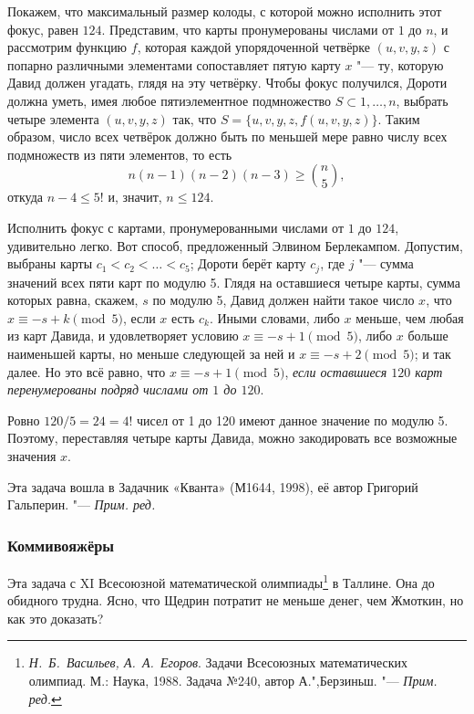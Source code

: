\documentclass[twoside]{book}
\newcommand\VsMO{\emph{Н.~Б.~Васильев, А.~А.~Егоров}. Задачи Всесоюзных математических олимпиад. М.: Наука, 1988}
\newenvironment{addedbytheeditors}{\par\medskip\small
}{\par\addvspace{\medskipamount}} %
\begin{document}
Покажем, что максимальный размер колоды, с которой можно исполнить этот фокус, равен $124$. Представим, что карты
пронумерованы числами от $1$ до $n$, и
рассмотрим функцию $f$, которая каждой упорядоченной четвёрке
$(u,v,y,z)$ с попарно различными элементами сопоставляет пятую карту
$x$ "--- ту, которую Давид должен угадать, глядя на эту четвёрку.
Чтобы фокус получился, Дороти должна уметь, имея любое
пятиэлементное подмножество $S\subset {1, \dots, n}$, выбрать четыре элемента $(u,v,y,z)$ так, что
$S = \{u,v,y,z, f(u,v,y,z)\}$.
Таким образом, число всех четвёрок
должно быть по меньшей мере равно числу всех
подмножеств из пяти элементов, то есть
\[n(n - 1)(n - 2)(n - 3)\ge \binom n5,\]
откуда $n - 4 \le5!$ и, значит, $n\le 124$.


Исполнить фокус с картами, пронумерованными числами от $1$
до $124$, удивительно легко.
Вот способ, предложенный Элвином
Берлекампом.
Допустим, выбраны карты $c_1 < c_2 < \ldots < c_5$;
Дороти берёт карту $c_j$, где $j$ "--- сумма значений всех пяти карт
по модулю 5.
Глядя на оставшиеся четыре карты, сумма которых равна, скажем, $s$ по модулю 5, Давид должен найти такое число
$x$, что $x\equiv -s + k \pmod 5$, если $x$ есть
$c_k$.
Иными словами, либо $x$ меньше, чем любая из карт Давида, и
удовлетворяет условию $x\equiv-s + 1 \pmod 5$, либо $x$ больше наименьшей
карты, но меньше следующей за ней и $x\equiv -s + 2 \pmod 5$; и так
далее.
Но это всё равно, что $x\equiv -s + 1 \pmod 5$,
\emph{если оставшиеся $120$ карт перенумерованы подряд числами от $1$ до $120$}.

Ровно $120/5 = 24 = 4!$ чисел от 1 до 120 имеют данное значение по модулю 5.
Поэтому, переставляя четыре карты Давида, можно закодировать все возможные значения $x$.
\heart

\begin{addedbytheeditors}
Эта задача вошла в Задачник «Кванта» ({М1644}, 1998), её автор
Григорий Гальперин.
"--- \emph{Прим. ред.}  
\end{addedbytheeditors}

\subsubsection*{Коммивояжёры} %

Эта задача с XI Всесоюзной математической олимпиады\footnote{%
\VsMO. Задача №240, автор  А.",Берзиньш. "--- \emph{Прим. ред.}} в
Таллине.
Она до обидного трудна. %
Ясно, что Щедрин потратит не меньше денег, чем Жмоткин,
но как это доказать? %
\end{document}
